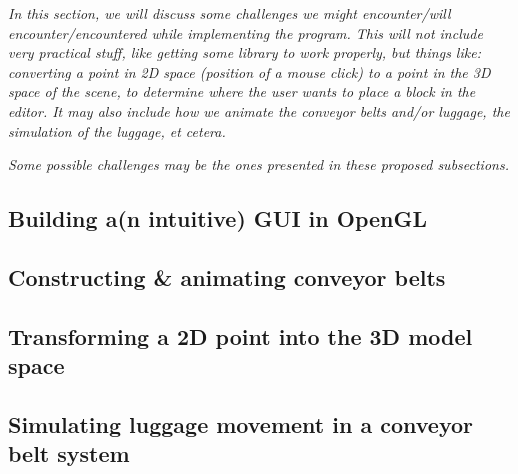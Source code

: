 \textit{In this section, we will discuss some challenges we might encounter/will encounter/encountered while implementing the program. This will not include very practical stuff, like getting some library to work properly, but things like: converting a point in 2D space (position of a mouse click) to a point in the 3D space of the scene, to determine where the user wants to place a block in the editor. It may also include how we animate the conveyor belts and/or luggage, the simulation of the luggage, et cetera.}

\textit{Some possible challenges may be the ones presented in these proposed subsections.}

\subsection{Building a(n intuitive) GUI in OpenGL}

\subsection{Constructing \& animating conveyor belts}

\subsection{Transforming a 2D point into the 3D model space}

\subsection{Simulating luggage movement in a conveyor belt system}
